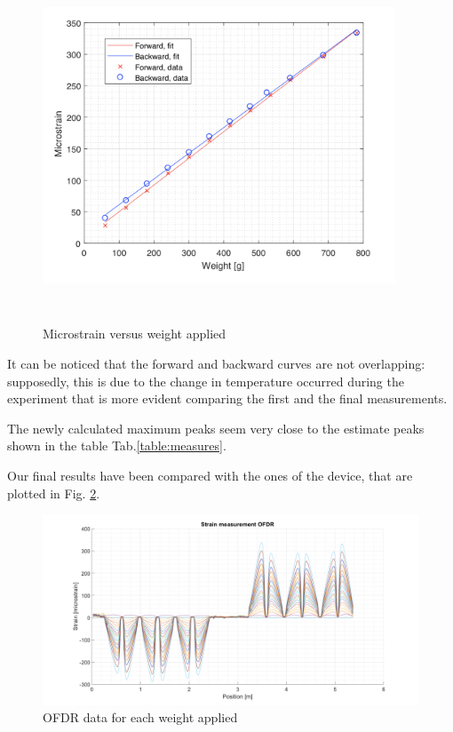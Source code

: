 \begin{figure}[H]
	\centering
	\includegraphics[height=10.5cm, width=10.5cm, keepaspectratio]{img/sensitivity.png}
	\caption{Microstrain versus weight applied}\label{fig:sensitivity}
\end{figure}

It can be noticed that the forward and backward curves are not overlapping: supposedly, this is due to the change in temperature occurred during the experiment that is more evident comparing the first and the final measurements.

The newly calculated maximum peaks seem very close to the estimate peaks shown in the table Tab.\ref{table:measures}.


Our final results have been compared with the ones of the device, that are plotted in Fig. \ref{fig:OFDR}.

\begin{figure}[H]
	\centering
	\includegraphics[scale=0.3]{img/OFDR.png}
	\caption{OFDR data for each weight applied}\label{fig:OFDR}
\end{figure}

